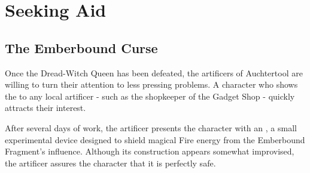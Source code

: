 \section*{Seeking Aid}
\subsection*{The Emberbound Curse}\label{subsec:AuchtertoolEmberboundCurse}
{\entryfont Once the Dread-Witch Queen has been defeated, the artificers of Auchtertool are willing to turn their attention to less pressing problems. A character who shows the \hyperref[mi:EmberboundFragment]{} to any local artificer - such as the shopkeeper of the Gadget Shop - quickly attracts their interest.

After several days of work, the artificer presents the character with an \hyperref[mi:ArcaneInsulator]{}, a small experimental device designed to shield magical Fire energy from the Emberbound Fragment's influence. Although its construction appears somewhat improvised, the artificer assures the character that it is perfectly safe.}